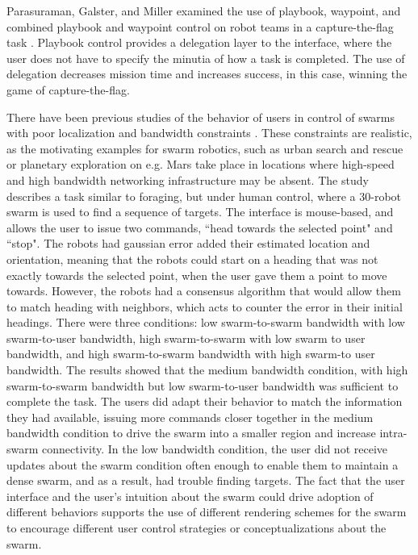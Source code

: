 Parasuraman, Galster, and Miller examined the use of playbook, waypoint, and combined playbook and waypoint control on robot teams in a capture-the-flag task \citep{parasuraman2005flexible}.
Playbook control provides a delegation layer to the interface, where the user does not have to specify the minutia of how a task is completed. 
The use of delegation decreases mission time and increases success, in this case, winning the game of capture-the-flag.

There have been previous studies of the behavior of users in control of swarms with poor localization and bandwidth constraints \citep{nunnally2012human}. 
These constraints are realistic, as the motivating examples for swarm robotics, such as urban search and rescue or planetary exploration on e.g. Mars take place in locations where high-speed and high bandwidth networking infrastructure may be absent. 
The study describes a task similar to foraging, but under human control, where a 30-robot swarm is used to find a sequence of targets. 
The interface is mouse-based, and allows the user to issue two commands, ``head towards the selected point" and ``stop". 
The robots had gaussian error added their estimated location and orientation, meaning that the robots could start on a heading that was not exactly towards the selected point, when the user gave them a point to move towards. 
However, the robots had a consensus algorithm that would allow them to match heading with neighbors, which acts to counter the error in their initial headings. 
There were three conditions: low swarm-to-swarm bandwidth with low swarm-to-user bandwidth, high swarm-to-swarm with low swarm to user bandwidth, and high swarm-to-swarm bandwidth with high swarm-to user bandwidth.
The results showed that the medium bandwidth condition, with high swarm-to-swarm bandwidth but low swarm-to-user bandwidth was sufficient to complete the task. 
The users did adapt their behavior to match the information they had available, issuing more commands closer together in the medium bandwidth condition to drive the swarm into a smaller region and increase intra-swarm connectivity. 
In the low bandwidth condition, the user did not receive updates about the swarm condition often enough to enable them to maintain a dense swarm, and as a result, had trouble finding targets. 
The fact that the user interface and the user's intuition about the swarm could drive adoption of different behaviors supports the use of different rendering schemes for the swarm to encourage different user control strategies or conceptualizations about the swarm. 

